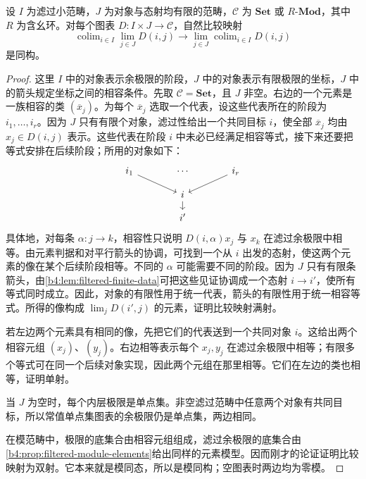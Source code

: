 \begin{proposition}[滤过余极限与有限极限交换]\label{b4:prop:filtered-colimits-finite-limits}
	设 \(I\) 为滤过小范畴，\(J\) 为对象与态射均有限的范畴，\(\mathcal C\) 为 \(\mathbf{Set}\) 或 \(R\text{-}\mathbf{Mod}\)，其中 \(R\) 为含幺环。对每个图表 \(D:I\times J\rightarrow\mathcal C\)，自然比较映射
	\[
		\operatorname{colim}_{i\in I}\lim_{j\in J}D(i,j) \longrightarrow \lim_{j\in J}\operatorname{colim}_{i\in I}D(i,j)
	\]
	是同构。
\end{proposition}
\begin{proof}
	这里 \(I\) 中的对象表示余极限的阶段，\(J\) 中的对象表示有限极限的坐标，\(J\) 中的箭头规定坐标之间的相容条件。先取 \(\mathcal C=\mathbf{Set}\)，且 \(J\) 非空。右边的一个元素是一族相容的类 \((\overline x_j)\)。为每个 \(\overline x_j\) 选取一个代表，设这些代表所在的阶段为 \(i_1,\ldots,i_r\)。因为 \(J\) 只有有限个对象，滤过性给出一个共同目标 \(i\)，使全部 \(\overline x_j\) 均由 \(x_j\in D(i,j)\) 表示。这些代表在阶段 \(i\) 中未必已经满足相容等式，接下来还要把等式安排在后续阶段；所用的对象如下：
	\[
		\begin{tikzcd}[column sep=large,row sep=small]
			i_1\arrow[dr]&\cdots&i_r\arrow[dl]\\
			&i\arrow[d]&\\
			&i'&
		\end{tikzcd}
	\]
	具体地，对每条 \(\alpha:j\rightarrow k\)，相容性只说明 \(D(i,\alpha)x_j\) 与 \(x_k\) 在滤过余极限中相等。由元素判据和对平行箭头的协调，可找到一个从 \(i\) 出发的态射，使这两个元素的像在某个后续阶段相等。不同的 \(\alpha\) 可能需要不同的阶段。因为 \(J\) 只有有限条箭头，由\cref{b4:lem:filtered-finite-data}可把这些见证协调成一个态射 \(i\rightarrow i'\)，使所有等式同时成立。因此，对象的有限性用于统一代表，箭头的有限性用于统一相容等式。所得的像构成 \(\lim_jD(i',j)\) 的元素，证明比较映射满射。

	若左边两个元素具有相同的像，先把它们的代表送到一个共同对象 \(i\)。这给出两个相容元组 \((x_j)\)、\((y_j)\)。右边相等表示每个 \(x_j,y_j\) 在滤过余极限中相等；有限多个等式可在同一个后续对象实现，因此两个元组在那里相等。它们在左边的类也相等，证明单射。

	当 \(J\) 为空时，每个内层极限是单点集。非空滤过范畴中任意两个对象有共同目标，所以常值单点集图表的余极限仍是单点集，两边相同。

	在模范畴中，极限的底集合由相容元组组成，滤过余极限的底集合由\cref{b4:prop:filtered-module-elements}给出同样的元素模型。因而刚才的论证证明比较映射为双射。它本来就是模同态，所以是模同构；空图表时两边均为零模。
\end{proof}

